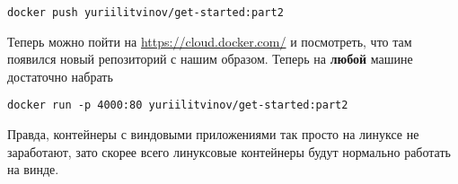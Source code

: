 \documentclass[a5paper]{article}
\begin{document}
\begin{verbatim}
docker push yuriilitvinov/get-started:part2
\end{verbatim}

Теперь можно пойти на \url{https://cloud.docker.com/} и посмотреть, что там появился новый репозиторий с нашим образом. Теперь на \textbf{любой} машине достаточно набрать
\begin{verbatim}
docker run -p 4000:80 yuriilitvinov/get-started:part2
\end{verbatim}

Правда, контейнеры с виндовыми приложениями так просто на линуксе не заработают, зато скорее всего линуксовые контейнеры будут нормально работать на винде.
\end{document}

